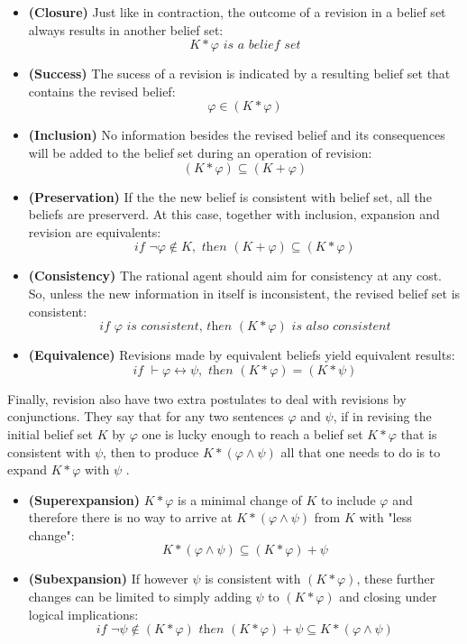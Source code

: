 \begin{itemize}
    \item[] \textbf{(Closure)} Just like in contraction, the outcome of a revision in a belief set always results in another belief set:
    $$K * \varphi \textit{ is a belief set}$$

    \item[] \textbf{(Success)} The sucess of a revision is indicated by a resulting belief set that contains the revised belief:
    $$\varphi \in (K * \varphi)$$

    \item[] \textbf{(Inclusion)} No information besides the revised belief and its consequences will be added to the belief set during an operation of revision:
    $$(K * \varphi) \subseteq (K + \varphi)$$

    \item[] \textbf{(Preservation)} If the the new belief is consistent with belief set, all the beliefs are preserverd. At this case, together with inclusion, expansion and revision are equivalents:
    $$\textit{if } \neg \varphi \notin K, \textit{ then } (K + \varphi) \subseteq (K * \varphi)$$

    \item[] \textbf{(Consistency)} The rational agent should aim for consistency at any cost. So, unless the new information in itself is inconsistent, the revised belief set is consistent:
    $$\textit{if } \varphi \textit{ is consistent, then } (K * \varphi) \textit{ is also consistent}$$

    \item[] \textbf{(Equivalence)} Revisions made by equivalent beliefs yield equivalent results:
    $$\textit{if } \vdash \varphi \leftrightarrow \psi, \textit{ then } (K * \varphi) = (K * \psi)$$
\end{itemize}

Finally, revision also have two extra postulates to deal with revisions by conjunctions. They say that for any two sentences $\varphi$ and $\psi$, if in revising the initial belief set $K$ by $\varphi$ one is lucky enough to reach a belief set $K * \varphi$ that is consistent with $\psi$, then to produce $K * (\varphi \wedge \psi)$ all that one needs to do is to expand $K * \varphi$ with $\psi$ \citep{Peppas2008}.

\begin{itemize}
    \item[] \textbf{(Superexpansion)} $K * \varphi$ is a minimal change of $K$ to include $\varphi$ and therefore there is no way to arrive at $K * (\varphi \wedge \psi)$ from $K$ with "less change":
    $$K * (\varphi \wedge \psi) \subseteq (K * \varphi) + \psi$$

    \item[] \textbf{(Subexpansion)} If however $\psi$ is consistent with $(K * \varphi)$, these further changes can be limited to simply adding $\psi$ to $(K * \varphi)$ and closing under logical implications:
    $$\textit{if } \neg \psi \notin (K * \varphi) \textit{ then } (K * \varphi) + \psi \subseteq K * (\varphi \wedge \psi)$$
\end{itemize}


